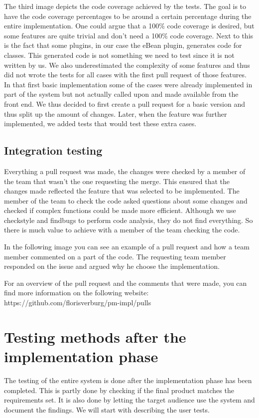 The third image depicts the code coverage achieved by the tests.
The goal is to have the code coverage percentages to be around a certain percentage during the entire implementation.
One could argue that a 100\% code coverage is desired, but some features are quite trivial and don't need a 100\% code coverage.
Next to this is the fact that some plugins, in our case the eBean plugin, generates code for classes.
This generated code is not something we need to test since it is not written by us.
We also underestimated the complexity of some features and thus did not wrote the tests for all cases with the first pull request of those features.
In that first basic implementation some of the cases were already implemented in part of the system but not actually called upon and made available from the front end.
We thus decided to first create a pull request for a basic version and thus split up the amount of changes.
Later, when the feature was further implemented, we added tests that would test these extra cases.



\subsection{Integration testing}
Everything a pull request was made, the changes were checked by a member of the team that wasn't the one requesting the merge.
This ensured that the changes made reflected the feature that was selected to be implemented.
The member of the team to check the code asked questions about some changes and checked if complex functions could be made more efficient.
Although we use checkstyle and findbugs to perform code analysis, they do not find everything.
So there is much value to achieve with a member of the team checking the code.

In the following image you can see an example of a pull request and how a team member commented on a part of the code.
The requesting team member responded on the issue and argued why he choose the implementation.


For an overview of the pull request and the comments that were made, you can find more information on the following website:
https://github.com/florisverburg/pm-impl/pulls

\section{Testing methods after the implementation phase}
The testing of the entire system is done after the implementation phase has been completed.
This is partly done by checking if the final product matches the requirements set.
It is also done by letting the target audience use the system and document the findings.
We will start with describing the user tests.

